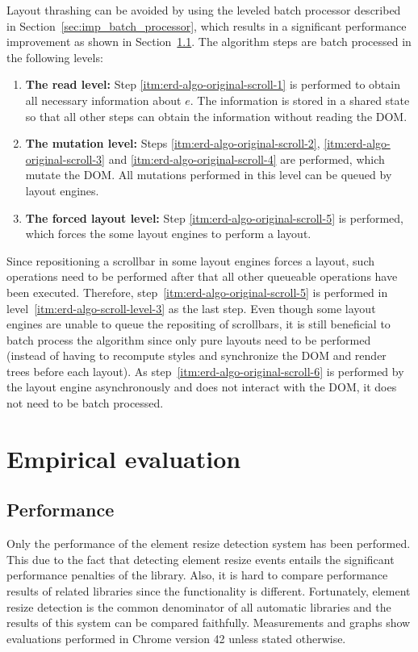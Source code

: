 \documentclass{acm_proc_article-sp}
\newcommand{\gls}[1]{#1}
\begin{document}
    Layout thrashing can be avoided by using the leveled batch processor described in Section~\ref{sec:imp_batch_processor}, which results in a significant performance improvement as shown in Section~\ref{sec:eval-perf}.
    The algorithm steps are batch processed in the following levels:
    \begin{enumerate}
      \item\label{itm:erd-algo-scroll-level-1}
        \textbf{The read level:}
        Step \ref{itm:erd-algo-original-scroll-1} is performed to obtain all necessary information about $e$.
        The information is stored in a shared state so that all other steps can obtain the information without reading the \gls{DOM}.
      \item\label{itm:erd-algo-scroll-level-2}
        \textbf{The mutation level:}
        Steps \ref{itm:erd-algo-original-scroll-2}, \ref{itm:erd-algo-original-scroll-3} and \ref{itm:erd-algo-original-scroll-4} are performed, which mutate the \gls{DOM}.
        All mutations performed in this level can be queued by layout engines.
      \item\label{itm:erd-algo-scroll-level-3}
        \textbf{The forced layout level:}
        Step \ref{itm:erd-algo-original-scroll-5} is performed, which forces the some layout engines to perform a layout.
    \end{enumerate}

    Since repositioning a scrollbar in some layout engines forces a layout, such operations need to be performed after that all other queueable operations have been executed.
    Therefore, step~\ref{itm:erd-algo-original-scroll-5} is performed in level~\ref{itm:erd-algo-scroll-level-3} as the last step.
    Even though some layout engines are unable to queue the repositing of scrollbars, it is still beneficial to batch process the algorithm since only pure layouts need to be performed (instead of having to recompute styles and synchronize the \gls{DOM} and render trees before each layout).
    As step~\ref{itm:erd-algo-original-scroll-6} is performed by the \gls{layout engine} asynchronously and does not interact with the \gls{DOM}, it does not need to be batch processed.

\section{Empirical evaluation}\label{sec:eval}
  \subsection{Performance}\label{sec:eval-perf}
    Only the performance of the element resize detection system has been performed.
    This due to the fact that detecting element resize events entails the significant performance penalties of the library.
    Also, it is hard to compare performance results of related libraries since the functionality is different.
    Fortunately, element resize detection is the common denominator of all automatic libraries and the results of this system can be compared faithfully.
    Measurements and graphs show evaluations performed in Chrome version 42 unless stated otherwise.
\end{document}
